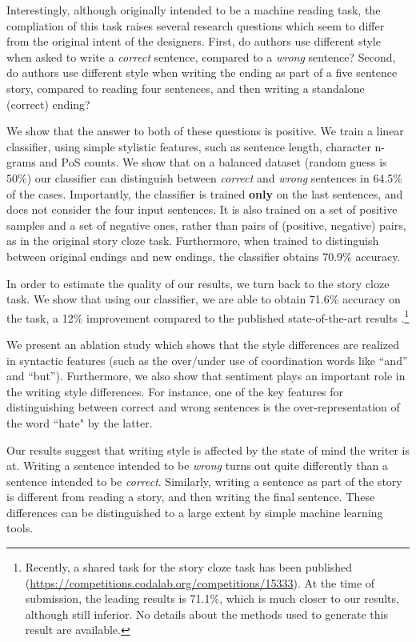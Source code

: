 \documentclass[11pt,a4paper]{article}
\begin{document}
Interestingly, although originally intended to be a machine reading task, the compliation of this task raises several research questions which seem to differ from the original intent of the designers.
First, do authors use different style when asked to write a {\it correct} sentence, compared to a {\it wrong} sentence?
Second, do authors use different style when writing the ending as part of a five sentence story, compared to reading four sentences, and then writing a standalone (correct) ending?

We show that the answer to both of these questions is positive. 
We train a linear classifier, using simple stylistic features, such as sentence length, character n-grams and PoS counts. 
We show that on a balanced dataset (random guess is 50\%) our classifier can distinguish between {\it correct} and {\it wrong} sentences in 64.5\% of the cases. 
Importantly, the classifier is trained {\bf only} on the last sentences, and does not consider the four input sentences.
It is also trained on a set of positive samples and a set of negative ones, rather than pairs of (positive, negative) pairs, as in the original story cloze task.
Furthermore, when trained to distinguish between original endings and new endings, the classifier obtains 70.9\% accuracy. 


In order to estimate the quality of our results, we turn back to the story cloze task.
We show that using our classifier, we are able to obtain 71.6\% accuracy on the task, a 12\% improvement compared to the published state-of-the-art results \cite{Speer:2016}.\footnote{Recently, a shared task for the story cloze task has been published (\url{https://competitions.codalab.org/competitions/15333}). 
At the time of submission, the leading results is 71.1\%, which is much closer to our results, although still inferior.
No details about the methods used to generate this result are available.}

We present an ablation study which shows that the style differences are realized in syntactic features (such as the over/under use of coordination words like ``and'' and ``but'').
Furthermore, we also show that sentiment plays an important role in the writing style differences.
For instance, one of the key features for distinguishing between correct and wrong sentences is the over-representation of the word ``hate" by the latter.

Our results suggest that writing style is affected by the state of mind the writer is at.
Writing a sentence intended to be {\it wrong} turns out quite differently than a sentence intended to be {\it correct}. 
Similarly, writing a sentence as part of the story is different from reading a story, and then writing the final sentence.
These differences can be distinguished to a large extent by simple machine learning tools.
\end{document}
